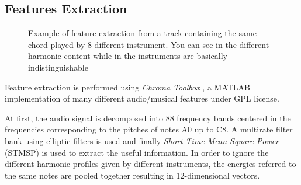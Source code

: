\subsection{Features Extraction}
\label{subsec:features}
%
\begin{figure}[t]
	\hfill
	\hfill
	\hfill
	\vspace{-4mm}
	\caption{Example of feature extraction from a track containing the same chord played by 8 different instrument. You can see in  the different harmonic content while in  the instruments are basically indistinguishable}
	\label{fig:exampleChromaToolbox}
	\vspace{-5mm}
\end{figure}
%
Feature extraction is performed using \textit{Chroma Toolbox} \cite{ChromaToolbox}, a MATLAB implementation of many different audio/musical features under GPL license.

At first, the audio signal is decomposed into 88 frequency bands centered in the frequencies corresponding to the pitches of notes A0 up to C8. A multirate filter bank using elliptic filters is used and finally \textit{Short-Time Mean-Square Power} (STMSP) is used to extract the useful information. In order to ignore the different harmonic profiles given by different instruments, the energies referred to the same notes are pooled together resulting in 12-dimensional vectors.

